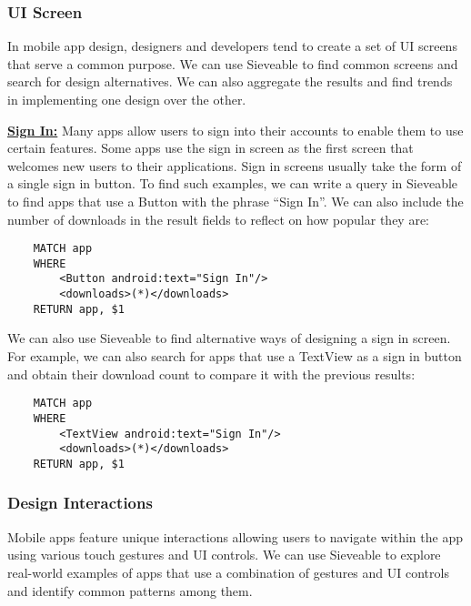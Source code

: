 \subsubsection{UI Screen}
In mobile app design, designers and developers tend to create a set of UI screens that serve a common purpose. 
We can use Sieveable to find common screens and search for design alternatives.
We can also aggregate the results and find trends in implementing one design over the other.

\underline{\textbf{Sign In:}}
Many apps allow users to sign into their accounts to enable them to use certain features.
Some apps use the sign in screen as the first screen that welcomes new users to their applications.
Sign in screens usually take the form of a single sign in button.
To find such examples, we can write a query in Sieveable to find apps that use a Button with the phrase ``Sign In''. 
We can also include the number of downloads in the result fields to reflect on how popular they are:
\begin{verbatim}
    MATCH app
    WHERE
        <Button android:text="Sign In"/>
        <downloads>(*)</downloads>
    RETURN app, $1
\end{verbatim}
We can also use Sieveable to find alternative ways of designing a sign in screen.
For example, we can also search for apps that use a TextView as a sign in button and obtain their download count to compare it with the previous results:
\begin{verbatim}
    MATCH app
    WHERE
        <TextView android:text="Sign In"/>
        <downloads>(*)</downloads>
    RETURN app, $1
\end{verbatim}

\subsubsection{Design Interactions}
Mobile apps feature unique interactions allowing users to navigate within the app using various touch gestures and UI controls. We can use Sieveable to explore real-world examples of apps that use a combination of gestures and UI controls and identify common patterns among them.
	
